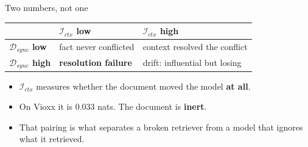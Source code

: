\documentclass[aspectratio=169]{beamer}
\begin{document}
\begin{frame}{Two numbers, not one}
  \vspace{0.2cm}
  \begin{center}
  \small
  \begin{tabular}{@{}lll@{}}
    \toprule
     & \textbf{$\mathcal{I}_{ctx}$ low} & \textbf{$\mathcal{I}_{ctx}$ high} \\
    \midrule
    \textbf{$\mathcal{D}_{sync}$ low}  & \textcolor{ok}{fact never conflicted} & \textcolor{ok}{context resolved the conflict} \\[3pt]
    \textbf{$\mathcal{D}_{sync}$ high} & \textcolor{update}{\textbf{resolution failure}} & \textcolor{retrieve}{drift: influential but losing} \\
    \bottomrule
  \end{tabular}
  \end{center}
  \vspace{1.1em}
  \begin{itemize}\setlength\itemsep{0.6em}
    \item $\mathcal{I}_{ctx}$ measures whether the document moved the model \textbf{at all}.
    \item On Vioxx it is $\mathbf{0.033}$ nats. The document is \textbf{inert}.
    \item That pairing is what separates a broken retriever from a model that ignores what it retrieved.
  \end{itemize}
\end{frame}
\end{document}
